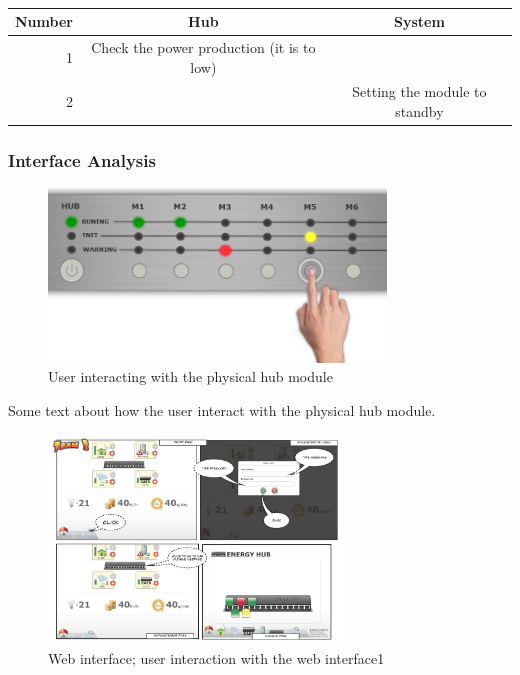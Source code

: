 		\\\begin{table}[h!]
					\begin{tabular}{| r | c | c |}
					\hline
					Number	& Hub				& System \\ \hline
					1		& Check the power production (it is to low)	& ~ \\ \hline
					2		& ~											& Setting the module to standby \\ \hline
					\end{tabular}
				\end{table}
	\newpage	
	\subsubsection{Interface Analysis}
		\begin{figure}[h!]		%
			\begin{centering}
				 \includegraphics[width=0.8\textwidth]{images/hub_user_interact.png}
				\caption{User interacting with the physical hub module}
		 	\end{centering}
		\end{figure}
		Some text about how the user interact with the physical hub module.
	\newpage
		\begin{figure}[h!]		%
			\begin{centering}
				 \includegraphics[width=0.7\textwidth]{images/web_interface1.jpg}
				\caption{Web interface; user interaction with the web interface1}
		 	\end{centering}
		\end{figure}

